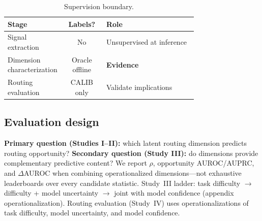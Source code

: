 \begin{table}[t]
  \centering
  \small
  \begin{tabular}{@{}p{0.26\linewidth}cp{0.48\linewidth}@{}}
    \toprule
    \textbf{Stage} & \textbf{Labels?} & \textbf{Role} \\
    \midrule
    Signal extraction & No & Unsupervised at inference \\
    Dimension characterization & Oracle offline & \textbf{Evidence} \\
    Routing evaluation & CALIB only & Validate implications \\
    \bottomrule
  \end{tabular}
  \caption{Supervision boundary.}
  \label{tab:supervision}
\end{table}

\subsection{Evaluation design}
\label{sec:method:evaluation}

\textbf{Primary question (Studies I--II):} which latent routing dimension predicts routing opportunity?
\textbf{Secondary question (Study III):} do dimensions provide complementary predictive content?
We report $\rho$, opportunity AUROC/AUPRC, and $\Delta$AUROC when combining operationalized dimensions---not exhaustive leaderboards over every candidate statistic.
Study~III ladder: task difficulty $\rightarrow$ difficulty + model uncertainty $\rightarrow$ joint with model confidence (appendix operationalization).
Routing evaluation (Study~IV) uses operationalizations of task difficulty, model uncertainty, and model confidence.
